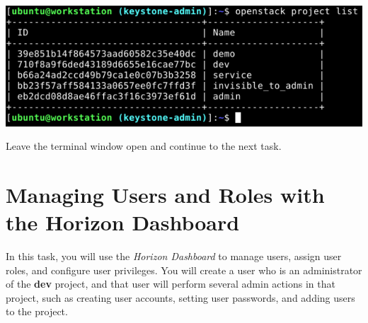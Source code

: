 \documentclass[letterpaper, 12pt]{article}
\begin{document}
\begin{enumerate}
\begin{labstep}
        \begin{center}
            \includegraphics[width=\linewidth]{images/part2/step10.png}
        \end{center}
    \end{labstep}

    \begin{labstep}
        Leave the terminal window open and continue to the next task.
    \end{labstep}
\end{enumerate}

\section{Managing Users and Roles with the Horizon Dashboard}\label{sec:managing-users-using-the-horizon-dashboard}
In this task, you will use the \textit{Horizon Dashboard} to manage users, assign user roles, and configure user privileges.
You will create a user who is an administrator of the \textbf{dev} project, and that user will perform several admin actions in that project, such as creating user accounts, setting user passwords, and adding users to the project.
\end{document}

